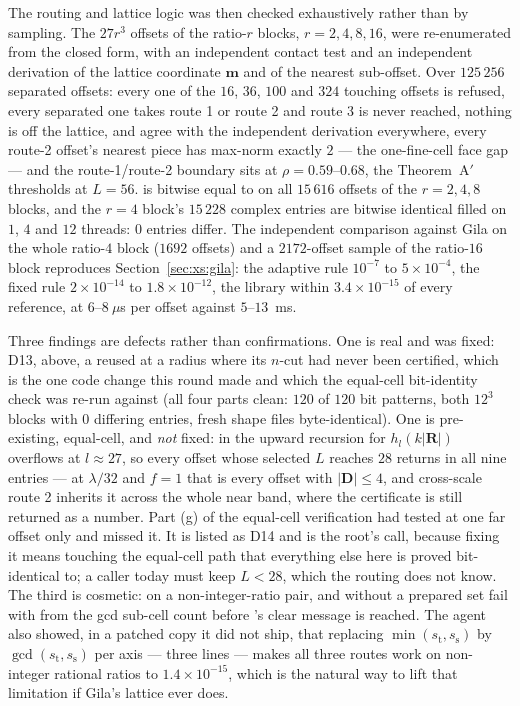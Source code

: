 \noindent
The routing and lattice logic was then checked exhaustively rather than by sampling. The
$27r^3$ offsets of the ratio-$r$ blocks, $r = 2,4,8,16$, were re-enumerated from the closed
form, with an independent contact test and an independent derivation of the lattice
coordinate $\mathbf{m}$ and of the nearest sub-offset. Over $125\,256$ separated offsets:
every one of the $16$, $36$, $100$ and $324$ touching offsets is refused, every separated one
takes route 1 or route 2 and route 3 is never reached, nothing is off the lattice,
 and  agree with the independent derivation everywhere, every route-2
offset's nearest piece has max-norm exactly $2$ --- the one-fine-cell face gap --- and the
route-1/route-2 boundary sits at $\rho = 0.59$--$0.68$, the Theorem~A$'$ thresholds at
$L = 56$.  is bitwise equal to  on all $15\,616$ offsets
of the $r = 2,4,8$ blocks, and the $r = 4$ block's $15\,228$ complex entries are bitwise
identical filled on $1$, $4$ and $12$ threads: $0$ entries differ. The independent
comparison against Gila on the whole ratio-$4$ block ($1692$ offsets) and a $2172$-offset
sample of the ratio-$16$ block reproduces Section~\ref{sec:xs:gila}: the adaptive rule $10^{-7}$ to
$5\times10^{-4}$, the fixed rule $2\times10^{-14}$ to $1.8\times10^{-12}$, the library
within $3.4\times10^{-15}$ of every reference, at $6$--$8~\mu$s per offset against
$5$--$13$~ms.

Three findings are defects rather than confirmations. One is real and was fixed: D13, above,
a  reused at a radius where its $n$-cut had never been certified, which is the
one code change this round made and which the equal-cell bit-identity check was re-run
against (all four parts clean: $120$ of $120$  bit patterns, both $12^3$
 blocks with $0$ differing entries, fresh shape files byte-identical). One is
pre-existing, equal-cell, and \emph{not} fixed: in  the upward recursion for
$h_l(k|\mathbf{R}|)$ overflows at $l\approx27$, so every offset whose selected $L$ reaches
$28$ returns  in all nine entries --- at $\lambda/32$ and $f = 1$ that is every
offset with $|\mathbf{D}|\le4$, and cross-scale route 2 inherits it across the whole near
band, where the certificate is still returned as a number. Part (g) of the equal-cell
verification had tested  at one far offset only and missed it. It is listed as
D14 and is the root's call, because fixing it means touching the equal-cell path that
everything else here is proved bit-identical to; a  caller today must keep
$L < 28$, which the routing does not know. The third is cosmetic: on a non-integer-ratio
pair,  and  without a prepared set fail with
 from the gcd sub-cell count before 's clear message is
reached. The agent also showed, in a patched copy it did not ship, that replacing
$\min(s_{\mathrm{t}},s_{\mathrm{s}})$ by $\gcd(s_{\mathrm{t}},s_{\mathrm{s}})$ per axis ---
three lines --- makes all three routes work on non-integer rational ratios to
$1.4\times10^{-15}$, which is the natural way to lift that limitation if Gila's lattice ever
does.

